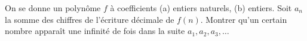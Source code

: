 On se donne un polynôme $f$ à coefficients (a) entiers naturels, (b) entiers. Soit $a_n$ la somme des chiffres de l'écriture décimale de $f(n)$. Montrer qu'un certain nombre apparaît une infinité de fois dans la suite $a_1, a_2, a_3, \ldots$
